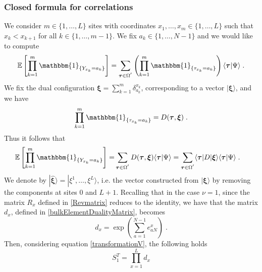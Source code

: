 \documentclass[10pt]{article}
\numberwithin{equation}{section}
\numberwithin{equation}{subsection}
\newcommand{\dt}{\;.}
\begin{document}
\subsubsection{Closed formula for correlations}\label{correlation-section}
We consider $m\in \{1,\ldots,L\}$ sites with coordinates $x_{1},\ldots,x_{m}\in \{1,\ldots,L\}$ such that $x_{k}<x_{k+1}$ for all $k\in \{1,\ldots,m-1\}$. We fix $a_{k}\in\{1,\ldots,N-1\}$ and we would like to compute
\begin{equation}
	\mathbb{E}\left[\prod_{k=1}^{m}\mathbbm{1}_{\{Y_{x_{k}}=a_{k}\}}\right]=\sum_{\bm{\tau}\in \Omega^{'}}\left(\prod_{k=1}^{m}\mathbbm{1}_{\{\tau_{x_{k}}=a_{k}\}}\right)\langle\bm{\tau}|\Psi\rangle\dt%
\end{equation}
We fix the dual configuration $\bm{\xi}=\sum_{k=1}^{m}\delta_{a_{k}}^{x_{k}}$, corresponding to a vector $|\bm{\xi}\rangle$, and we have 
\begin{equation}
	\prod_{k=1}^{m}\mathbbm{1}_{\{\tau_{x_{k}}=a_{k}\}}=D(\bm{\tau},\bm{\xi})\dt
\end{equation}
Thus it follows that 
\begin{align}
	\mathbb{E}\left[\prod_{k=1}^{m}\mathbbm{1}_{\{Y_{x_{k}}=a_{k}\}}\right]=&\sum_{\bm{\tau}\in \Omega^{'}}D(\bm{\tau},\bm{\xi})\langle\bm{\tau}|\Psi\rangle
	=\sum_{\bm{\tau}\in \Omega^{'}}\langle \bm{\tau}|D|\bm{\xi}\rangle\langle\bm{\tau}|\Psi\rangle\dt
\end{align}
We denote by $|\hat{\bm{\xi}}\rangle=|\xi^{1},\ldots,\xi^{L}\rangle$, i.e. the vector constructed from $|\bm{\xi}\rangle$ by removing the components at sites $0$ and $L+1$. Recalling that {\color{blue} in the case $\nu=1$, since the matrix $R_{x}$ defined in \eqref{Revmatrix} reduces to the identity, we have that the matrix $d_{x}$, defined in \eqref{bulkElementDualityMatrix}, becomes
\begin{equation}
	d_{x}=\exp{(\sum_{a=1}^{N-1}e_{aN}^{x})}\dt
	\end{equation} Then, considering equation \eqref{transformationV}, the following holds}
\begin{equation}
	S_{1}^{T}=\prod_{x=1}^{L}d_{x}
\end{equation}  
\end{document}
